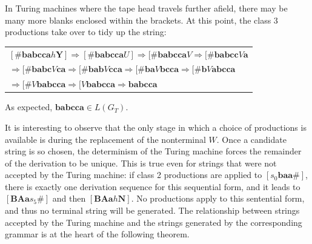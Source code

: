 In Turing machines where the tape head travels further afield, there may be
many more blanks enclosed within the brackets. At this point, the class 3
productions take over to tidy up the string:
\begin{center}\begin{tabular}{l}
$[\pmb{\#babcca}h\pmb{Y}]\Rightarrow[\pmb{\#babcca}U]\Rightarrow[\pmb{\#babcca}V
	\Rightarrow[\pmb{\#babcc}V\pmb{a}$ \\
$\Rightarrow[\pmb{\#babc}V\pmb{ca}\Rightarrow[\pmb{\#bab}V\pmb{cca}\Rightarrow
	[\pmb{\#ba}V\pmb{bcca}\Rightarrow[\pmb{\#b}V\pmb{abcca}$ \\
$\Rightarrow[\pmb{\#}V\pmb{babcca}\Rightarrow[V\pmb{babcca}\Rightarrow
	\pmb{babcca}$
\end{tabular}\end{center}
As expected, $\pmb{babcca}\in L(G_T)$.

It is interesting to observe that the only stage in which a choice of productions
is available is during the replacement of the nonterminal $W$. Once a candidate
string is so chosen, the determinism of the Turing machine forces the remainder
of the derivation to be unique. This is true even for strings that were not
accepted by the Turing machine: if class 2 productions are applied to $[s_0\pmb{
baa\#}]$, there is exactly one derivation sequence for this sequential form, and
it leads to $[\pmb{BAa}s_5\pmb{\#}]$ and then $[\pmb{BAa}h\pmb{N}]$. No productions
apply to this sentential form, and thus no terminal string will be generated.
The relationship between strings accepted by the Turing machine and the strings
generated by the corresponding grammar is at the heart of the following theorem.

